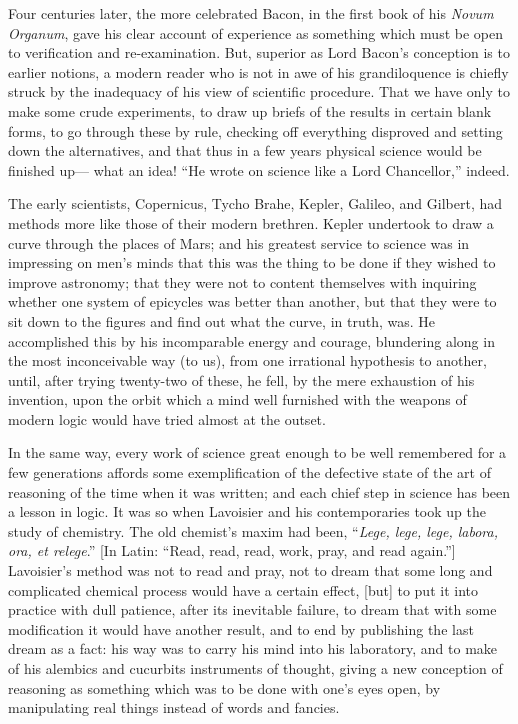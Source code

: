 Four centuries later, the more celebrated Bacon, in the first book of his \emph{Novum Organum}, gave his clear account of experience as something which must be open to verification and re-examination. But, superior as Lord Bacon's conception is to earlier notions, a modern reader who is not in awe of his grandiloquence is chiefly struck by the inadequacy of his view of scientific procedure. That we have only to make some crude experiments, to draw up briefs of the results in certain blank forms, to go through these by rule, checking off everything disproved and setting down the alternatives, and that thus in a few years physical science would be finished up--- what an idea! ``He wrote on science like a Lord Chancellor,'' indeed. 

The early scientists, Copernicus, Tycho Brahe, Kepler, Galileo, and Gilbert, had methods more like those of their modern brethren. Kepler undertook to draw a curve through the places of Mars; and his greatest service to science was in impressing on men's minds that this was the thing to be done if they wished to improve astronomy; that they were not to content themselves with inquiring whether one system of epicycles was better than another, but that they were to sit down to the figures and find out what the curve, in truth, was. He accomplished this by his incomparable energy and courage, blundering along in the most inconceivable way (to us), from one irrational hypothesis to another, until, after trying twenty-two of these, he fell, by the mere exhaustion of his invention, upon the orbit which a mind well furnished with the weapons of modern logic would have tried almost at the outset.

In the same way, every work of science great enough to be well remembered for a few generations affords some exemplification of the defective state of the art of reasoning of the time when it was written; and each chief step in science has been a lesson in logic. It was so when Lavoisier and his contemporaries took up the study of chemistry. The old chemist's maxim had been, ``\emph{Lege, lege, lege, labora, ora, et relege}.'' [In Latin: ``Read, read, read, work, pray, and read again.''] Lavoisier's method was not to read and pray, not to dream that some long and complicated chemical process would have a certain effect, [but] to put it into practice with dull patience, after its inevitable failure, to dream that with some modification it would have another result, and to end by publishing the last dream as a fact: his way was to carry his mind into his laboratory, and to make of his alembics and cucurbits instruments of thought, giving a new conception of reasoning as something which was to be done with one's eyes open, by manipulating real things instead of words and fancies.

